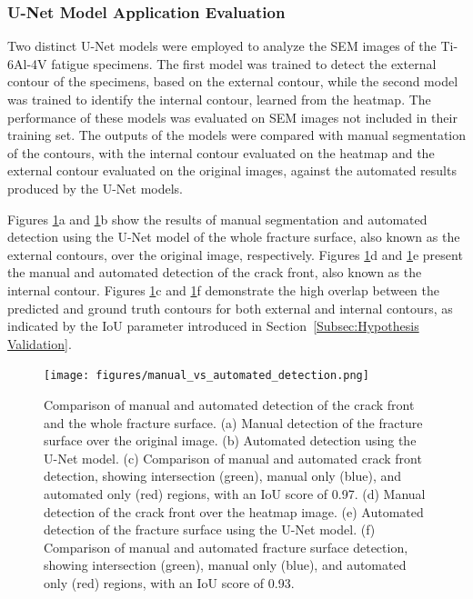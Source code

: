 \documentclass{ieeeaccess}
\begin{document}
\subsubsection{U-Net Model Application Evaluation}
\label{Subsubsec: U-Net Model Application Evaluation}
Two distinct U-Net models were employed to analyze the SEM images of the Ti-6Al-4V fatigue specimens.
The first model was trained to detect the external contour of the specimens, based on the external contour, while the second model was trained to identify the internal contour, learned from the heatmap.
The performance of these models was evaluated on SEM images not included in their training set. The outputs of the models were compared with manual segmentation of the contours, with the internal contour evaluated on the heatmap and the external contour evaluated on the original images, against the automated results produced by the U-Net models.

Figures \ref{fig:manual_vs_automated_detection}a and \ref{fig:manual_vs_automated_detection}b show the results of manual segmentation and automated detection using the U-Net model of the whole fracture surface, also known as the external contours, over the original image, respectively. Figures \ref{fig:manual_vs_automated_detection}d and \ref{fig:manual_vs_automated_detection}e present the manual and automated detection of the crack front, also known as the internal contour. Figures \ref{fig:manual_vs_automated_detection}c and \ref{fig:manual_vs_automated_detection}f demonstrate the high overlap between the predicted and ground truth contours for both external and internal contours, as indicated by the IoU parameter introduced in Section~\ref{Subsec:Hypothesis Validation}.


\begin{figure}[!t]
\centering
\texttt{[image: figures/manual\_vs\_automated\_detection.png]}
\caption{Comparison of manual and automated detection of the crack front and the whole fracture surface. (a) Manual detection of the fracture surface over the original image. (b) Automated detection using the U-Net model. (c) Comparison of manual and automated crack front detection, showing intersection (green), manual only (blue), and automated only (red) regions, with an IoU score of 0.97. (d) Manual detection of the crack front over the heatmap image. (e) Automated detection of the fracture surface using the U-Net model. (f) Comparison of manual and automated fracture surface detection, showing intersection (green), manual only (blue), and automated only (red) regions, with an IoU score of 0.93.}

\label{fig:manual_vs_automated_detection}
\end{figure}
\end{document}
